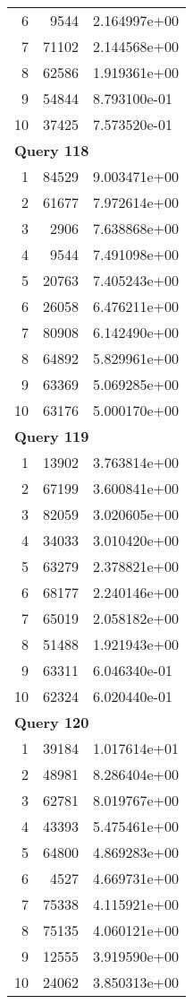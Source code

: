 \begin{longtable}[{p}]{@{}rrp{}@{}}
6 & 9544 & 2.164997e+00 \\
7 & 71102 & 2.144568e+00 \\
8 & 62586 & 1.919361e+00 \\
9 & 54844 & 8.793100e-01 \\
10 & 37425 & 7.573520e-01 \\
\midrule
\multicolumn{3}{l}{\bfseries Query 118} \\
1 & 84529 & 9.003471e+00 \\
2 & 61677 & 7.972614e+00 \\
3 & 2906 & 7.638868e+00 \\
4 & 9544 & 7.491098e+00 \\
5 & 20763 & 7.405243e+00 \\
6 & 26058 & 6.476211e+00 \\
7 & 80908 & 6.142490e+00 \\
8 & 64892 & 5.829961e+00 \\
9 & 63369 & 5.069285e+00 \\
10 & 63176 & 5.000170e+00 \\
\midrule
\multicolumn{3}{l}{\bfseries Query 119} \\
1 & 13902 & 3.763814e+00 \\
2 & 67199 & 3.600841e+00 \\
3 & 82059 & 3.020605e+00 \\
4 & 34033 & 3.010420e+00 \\
5 & 63279 & 2.378821e+00 \\
6 & 68177 & 2.240146e+00 \\
7 & 65019 & 2.058182e+00 \\
8 & 51488 & 1.921943e+00 \\
9 & 63311 & 6.046340e-01 \\
10 & 62324 & 6.020440e-01 \\
\midrule
\multicolumn{3}{l}{\bfseries Query 120} \\
1 & 39184 & 1.017614e+01 \\
2 & 48981 & 8.286404e+00 \\
3 & 62781 & 8.019767e+00 \\
4 & 43393 & 5.475461e+00 \\
5 & 64800 & 4.869283e+00 \\
6 & 4527 & 4.669731e+00 \\
7 & 75338 & 4.115921e+00 \\
8 & 75135 & 4.060121e+00 \\
9 & 12555 & 3.919590e+00 \\
10 & 24062 & 3.850313e+00 \\

\end{longtable}
